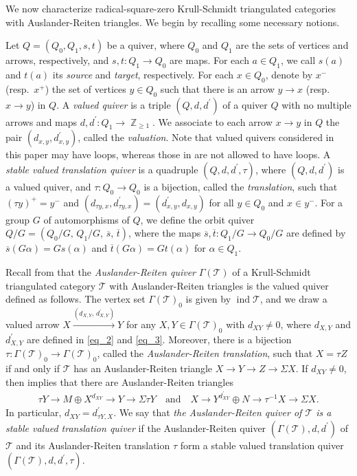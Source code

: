 \documentclass[12pt]{amsart}
\numberwithin{equation}{subsection}
\theoremstyle{plain}
\theoremstyle{definition}
\newcommand{\ind}{\operatorname{ind}}
\newcommand{\Z}{\operatorname{\mathbb{Z}}\nolimits}
\newcommand{\G}{\Gamma}
\newcommand{\T}{\mathcal{T}}
\begin{document}
We now characterize radical-square-zero Krull-Schmidt triangulated categories with Auslander-Reiten triangles.
We begin by recalling some necessary notions.






Let $Q=(Q_0, Q_1, s, t)$ be a quiver, where $Q_0$ and $Q_1$ are the sets of vertices and arrows, respectively, and $s, t: Q_1 \to Q_0$ are maps.
For each $a\in Q_1$, we call $s(a)$ and $t(a)$ its {\it source} and {\it target}, respectively.
For each $x \in Q_0$, denote by $x^-$ (resp.~$x^+$) the set of vertices $y\in Q_0$ such that there is an arrow $y\to x$ (resp.~$x \to y$) in $Q$.
A {\it  valued quiver} is a triple $(Q, d, d^\prime)$ of a quiver $Q$ with no multiple arrows and maps $d, d^\prime: Q_1 \to \Z_{\geq 1}$.
We associate to each arrow $x \to y$ in $Q$ the pair $(d_{x, y}, d_{x, y}^\prime)$, called the {\it valuation}.
Note that valued quivers considered in this paper may have loops, whereas those in \cite{Happel-Preiser-Ringel_1980} are not allowed to have loops.
A {\it stable valued translation quiver} is a quadruple $(Q, d, d^\prime, \tau)$, where $(Q, d, d^\prime)$ is a valued quiver, and $\tau: Q_0\to Q_0$ is a bijection, called the {\it translation}, such that $(\tau y)^+ = y^-$ and $(d_{\tau y, x}, d_{\tau y, x}^\prime) = (d_{x, y}^\prime, d_{x, y})$ for all $y \in Q_0$ and $x\in y^-$.
For a group $G$ of automorphisms of $Q$, we define the orbit quiver $Q/G=(Q_0/G,\,  Q_1/G,\,  \overline{s},\,  \overline{t})$, where the maps $\overline{s},\overline{t}:Q_1/G\to Q_0/G$ are defined by $\overline{s}(G\alpha)=Gs(\alpha)$ and $\overline{t}(G\alpha)=Gt(\alpha)$ for $\alpha\in Q_1$.






Recall from \cite{Happel_book} that the {\it Auslander-Reiten quiver} $\G(\T)$ of a Krull-Schmidt triangulated category $\T$ with Auslander-Reiten triangles is the valued quiver defined as follows. 
The vertex set $\G(\T)_0$ is given by $\ind\T$, and we draw a valued arrow $X \xrightarrow{(d_{X,Y},\, d_{X,Y}^\prime)} Y$ for any $X, Y \in \G(\T)_0$ with $d_{XY}\neq 0$, where $d_{X, Y}$ and $d_{X, Y}^\prime$ are defined in \eqref{eq_2} and \eqref{eq_3}.
Moreover, there is a bijection $\tau: \G(\T)_0 \to \G(\T)_0$, called the {\it Auslander-Reiten translation}, such that $X=\tau Z$ if and only if $\T$ has an Auslander-Reiten triangle $X\to Y\to Z \to \Sigma X$.
If $d_{XY}\neq 0$, then \cite[Proposition 3.12]{Iyama-Nakaoka-Palu_2024} implies that there are Auslander-Reiten triangles 
\begin{align}
    \tau Y \to  M \oplus X^{d_{XY}}\to Y \to \Sigma \tau Y
    \quad\text{and}\quad
    X \to Y^{d_{XY}^\prime}\oplus N \to \tau^{-1} X \to \Sigma X.
\end{align}
In particular, $d_{XY} = d_{\tau Y, X}^\prime$.
We say that {\it the Auslander-Reiten quiver of $\T$ is a stable valued translation quiver} if the Auslander-Reiten quiver $(\G(\T), d, d^\prime)$ of $\T$ and its Auslander-Reiten translation $\tau$ form a stable valued translation quiver $(\G(\T), d, d^\prime, \tau)$.
\end{document}
